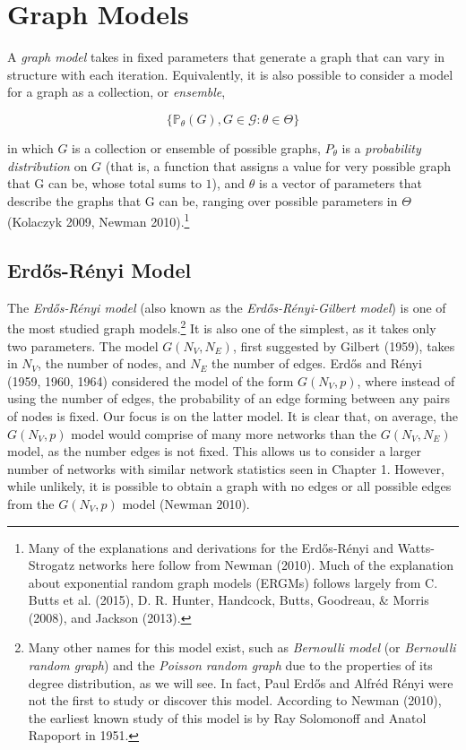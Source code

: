 \documentclass[12pt,twoside]{amherstthesis}
\begin{document}
  \chapter{Graph Models}\label{graph-models}
  
  A \emph{graph model} takes in fixed parameters that generate a graph
  that can vary in structure with each iteration. Equivalently, it is also
  possible to consider a model for a graph as a collection, or
  \emph{ensemble},
  
  \[\{\mathbb{P}_{\theta}(G), G \in \mathcal{G}: \theta \in \Theta\}\]
  
  in which \(G\) is a collection or ensemble of possible graphs,
  \(P_\theta\) is a \emph{probability distribution} on \(G\) (that is, a
  function that assigns a value for very possible graph that G can be,
  whose total sums to \(1\)), and \(\theta\) is a vector of parameters
  that describe the graphs that G can be, ranging over possible parameters
  in \(\Theta\) (Kolaczyk 2009, Newman 2010).\footnote{Many of the
    explanations and derivations for the Erdős-Rényi and Watts-Strogatz
    networks here follow from Newman (2010). Much of the explanation about
    exponential random graph models (ERGMs) follows largely from C. Butts
    et al. (2015), D. R. Hunter, Handcock, Butts, Goodreau, \& Morris
    (2008), and Jackson (2013).}
  
  \section{Erdős-Rényi Model}\label{erdos-renyi-model}
  
  The \emph{Erdős-Rényi model} (also known as the
  \emph{Erdős-Rényi-Gilbert model}) is one of the most studied graph
  models.\footnote{Many other names for this model exist, such as
    \emph{Bernoulli model} (or \emph{Bernoulli random graph}) and the
    \emph{Poisson random graph} due to the properties of its degree
    distribution, as we will see. In fact, Paul Erdős and Alfréd Rényi
    were not the first to study or discover this model. According to
    Newman (2010), the earliest known study of this model is by Ray
    Solomonoff and Anatol Rapoport in 1951.} It is also one of the
  simplest, as it takes only two parameters. The model \(G(N_V, N_E)\),
  first suggested by Gilbert (1959), takes in \(N_V\), the number of
  nodes, and \(N_E\) the number of edges. Erdős and Rényi (1959, 1960,
  1964) considered the model of the form \(G(N_{V}, p)\), where instead of
  using the number of edges, the probability of an edge forming between
  any pairs of nodes is fixed. Our focus is on the latter model. It is
  clear that, on average, the \(G(N_{V}, p)\) model would comprise of many
  more networks than the \(G(N_V, N_E)\) model, as the number edges is not
  fixed. This allows us to consider a larger number of networks with
  similar network statistics seen in Chapter 1. However, while unlikely,
  it is possible to obtain a graph with no edges or all possible edges
  from the \(G(N_{V}, p)\) model (Newman 2010).
  
\end{document}
